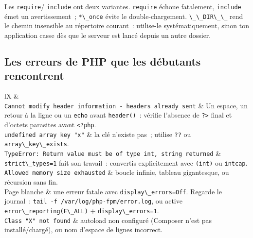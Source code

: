 \begin{note}
Les \verb|require|/ \verb|include| ont deux variantes. \verb|require| \'echoue fatalement,
\verb|include| \'emet un avertissement~; \verb|*\_once| \'evite le double-chargement. \verb|\_\_DIR\_\_| rend
le chemin insensible au r\'epertoire courant~: utilise-le syst\'ematiquement, sinon ton application
casse d\`es que le serveur est lanc\'e depuis un autre dossier.
\end{note}

\subsection{Les erreurs de PHP que les d\'ebutants rencontrent}

\begin{tabz}{lX}
  \headrow {} \&  \\
  \midrule
  \verb|Cannot modify header information - headers already sent| \& Un espace, un retour \`a la ligne ou un \verb|echo| avant \verb|header()|~: v\'erifie l'absence de \verb|?>| final et d'octets parasites avant \verb|<?php|. \\
  \verb|undefined array key "x"| \& la cl\'e n'existe pas~; utilise \verb|??| ou \verb|array\_key\_exists|. \\
  \verb|TypeError: Return value must be of type int, string returned| \& \verb|strict\_types=1| fait son travail~: convertis explicitement avec \verb|(int)| ou \verb|intcap|. \\
  \verb|Allowed memory size exhausted| \& boucle infinie, tableau gigantesque, ou r\'ecursion sans fin. \\
  Page blanche \& une erreur fatale avec \verb|display\_errors=Off|. Regarde le journal~: \verb|tail -f /var/log/php-fpm/error.log|, ou active \verb|error\_reporting(E\_ALL)| + \verb|display\_errors=1|. \\
  \verb|Class "X" not found| \& autoload non configur\'e (Composer n'est pas install\'e/charg\'e), ou nom d'espace de lignes incorrect. \\
\end{tabz}

